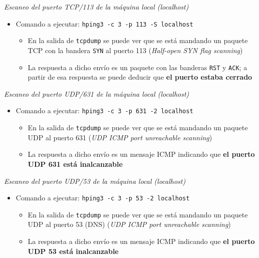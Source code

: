 \emph{Escaneo del puerto TCP/113 de la máquina local (localhost)} 

\begin{itemize}
    \item Comando a ejecutar: \texttt{hping3 -c 3 -p 113 -S localhost} 
    \begin{itemize}
        \item En la salida de \texttt{tcpdump} se puede ver que se está mandando un paquete TCP con la bandera \texttt{SYN} al puerto 113 (\emph{Half-open SYN flag scanning})
        \item La respuesta a dicho envío es un paquete con las banderas \texttt{RST} y \texttt{ACK}; a partir de esa respuesta se puede deducir que \textbf{el puerto estaba cerrado}   
    \end{itemize}
\end{itemize}

\emph{Escaneo del puerto UDP/631 de la máquina local (localhost)} 

\begin{itemize}
    \item Comando a ejecutar: \texttt{hping3 -c 3 -p 631 -2 localhost} 
    \begin{itemize}
        \item En la salida de \texttt{tcpdump} se puede ver que se está mandando un paquete UDP al puerto 631 (\emph{UDP ICMP port unreachable scanning})
        \item La respuesta a dicho envío es un mensaje ICMP indicando que \textbf{el puerto UDP 631 está inalcanzable} 
    \end{itemize}
\end{itemize}

\emph{Escaneo del puerto UDP/53 de la máquina local (localhost)} 

\begin{itemize}
    \item Comando a ejecutar: \texttt{hping3 -c 3 -p 53 -2 localhost} 
    \begin{itemize}
        \item En la salida de \texttt{tcpdump} se puede ver que se está mandando un paquete UDP al puerto 53 (DNS) (\emph{UDP ICMP port unreachable scanning})
        \item La respuesta a dicho envío es un mensaje ICMP indicando que \textbf{el puerto UDP 53 está inalcanzable} 
    \end{itemize}
\end{itemize}

